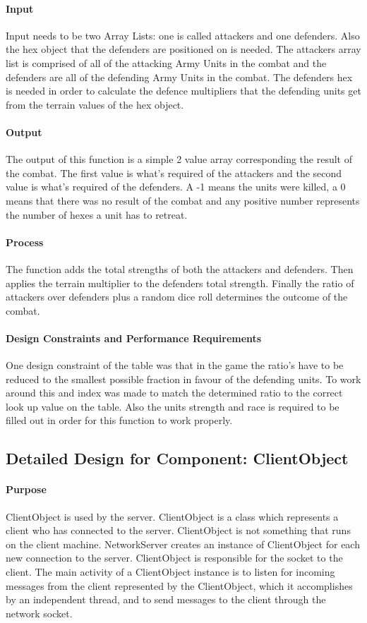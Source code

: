 \documentclass[12pt,a4paper,titlepage]{article}
\begin{document}
\paragraph{Input} Input needs to be two Array Lists: one is called attackers and one defenders. Also the hex object that the defenders are positioned on is needed. The attackers array list is comprised of all of the attacking Army Units in the combat and the defenders are all of the defending Army Units in the combat. The defenders hex is needed in order to calculate the defence multipliers that the defending units get from the terrain values of the hex object.
\paragraph{Output} The output of this function is a simple 2 value array corresponding the result of the combat. The first value is what's required of the attackers and the second value is what's required of the defenders. A -1 means the units were killed, a 0 means that there was no result of the combat and any positive number represents the number of hexes a unit has to retreat. 
\paragraph{Process} The function adds the total strengths of both the attackers and defenders. Then applies the terrain multiplier to the defenders total strength. Finally the ratio of attackers over defenders plus a random dice roll determines the outcome of the combat.  
\paragraph{Design Constraints and Performance Requirements} One design constraint of the table was that in the game the ratio's have to be reduced to the smallest possible fraction in favour of the defending units. To work around this and index was made to match the determined ratio to the correct look up value on the table. Also the units strength and race is required to be filled out in order for this function to work properly. 

\subsection{Detailed Design for Component: ClientObject }
\paragraph{Purpose} ClientObject is used by the server. ClientObject is a class which represents a client who has connected to the server. ClientObject is not something that runs on the client machine. NetworkServer creates an instance of ClientObject for each new connection to the server. ClientObject is responsible for the socket to the client. The main activity of a ClientObject instance is to listen for incoming messages from the client represented by the ClientObject, which it accomplishes by an independent thread, and to send messages to the client through the network socket.
\end{document}

